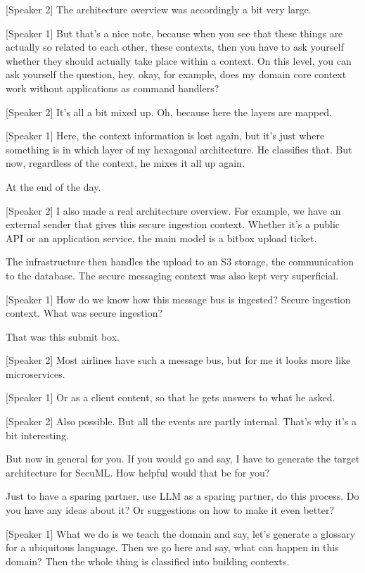 [Speaker 2]
The architecture overview was accordingly a bit very large.

[Speaker 1]
But that's a nice note, because when you see that these things are actually so related to each other, these contexts, then you have to ask yourself whether they should actually take place within a context. On this level, you can ask yourself the question, hey, okay, for example, does my domain core context work without applications as command handlers?

[Speaker 2]
It's all a bit mixed up. Oh, because here the layers are mapped.

[Speaker 1]
Here, the context information is lost again, but it's just where something is in which layer of my hexagonal architecture. He classifies that. But now, regardless of the context, he mixes it all up again.

At the end of the day.

[Speaker 2]
I also made a real architecture overview. For example, we have an external sender that gives this secure ingestion context. Whether it's a public API or an application service, the main model is a bitbox upload ticket.

The infrastructure then handles the upload to an S3 storage, the communication to the database. The secure messaging context was also kept very superficial.

[Speaker 1]
How do we know how this message bus is ingested? Secure ingestion context. What was secure ingestion?

That was this submit box.

[Speaker 2]
Most airlines have such a message bus, but for me it looks more like microservices.

[Speaker 1]
Or as a client content, so that he gets answers to what he asked.

[Speaker 2]
Also possible. But all the events are partly internal. That's why it's a bit interesting.

But now in general for you. If you would go and say, I have to generate the target architecture for SecuML. How helpful would that be for you?

Just to have a sparing partner, use LLM as a sparing partner, do this process. Do you have any ideas about it? Or suggestions on how to make it even better?

[Speaker 1]
What we do is we teach the domain and say, let's generate a glossary for a ubiquitous language. Then we go here and say, what can happen in this domain? Then the whole thing is classified into building contexts.

